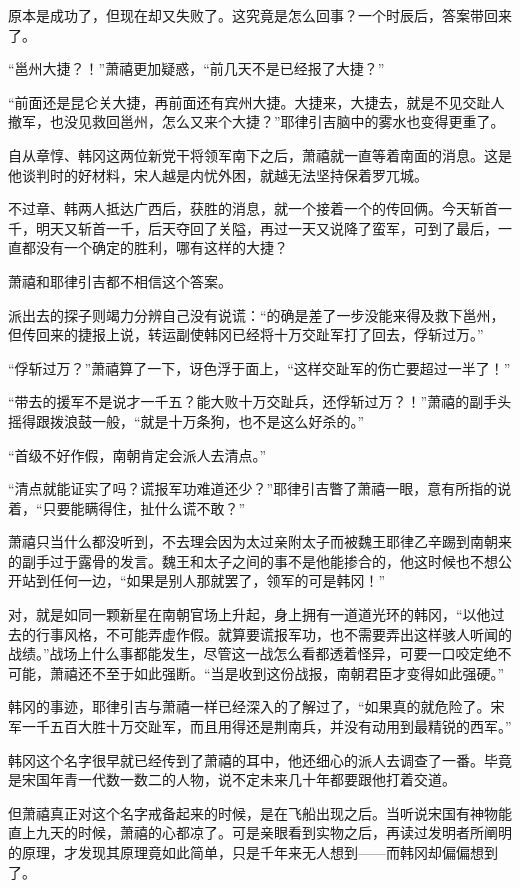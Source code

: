 原本是成功了，但现在却又失败了。这究竟是怎么回事？一个时辰后，答案带回来了。

“邕州大捷？！”萧禧更加疑惑，“前几天不是已经报了大捷？”

“前面还是昆仑关大捷，再前面还有宾州大捷。大捷来，大捷去，就是不见交趾人撤军，也没见救回邕州，怎么又来个大捷？”耶律引吉脑中的雾水也变得更重了。

自从章惇、韩冈这两位新党干将领军南下之后，萧禧就一直等着南面的消息。这是他谈判时的好材料，宋人越是内忧外困，就越无法坚持保着罗兀城。

不过章、韩两人抵达广西后，获胜的消息，就一个接着一个的传回俩。今天斩首一千，明天又斩首一千，后天夺回了关隘，再过一天又说降了蛮军，可到了最后，一直都没有一个确定的胜利，哪有这样的大捷？

萧禧和耶律引吉都不相信这个答案。

派出去的探子则竭力分辨自己没有说谎：“的确是差了一步没能来得及救下邕州，但传回来的捷报上说，转运副使韩冈已经将十万交趾军打了回去，俘斩过万。”

“俘斩过万？”萧禧算了一下，讶色浮于面上，“这样交趾军的伤亡要超过一半了！”

“带去的援军不是说才一千五？能大败十万交趾兵，还俘斩过万？！”萧禧的副手头摇得跟拨浪鼓一般，“就是十万条狗，也不是这么好杀的。”

“首级不好作假，南朝肯定会派人去清点。”

“清点就能证实了吗？谎报军功难道还少？”耶律引吉瞥了萧禧一眼，意有所指的说着，“只要能瞒得住，扯什么谎不敢？”

萧禧只当什么都没听到，不去理会因为太过亲附太子而被魏王耶律乙辛踢到南朝来的副手过于露骨的发言。魏王和太子之间的事不是他能掺合的，他这时候也不想公开站到任何一边，“如果是别人那就罢了，领军的可是韩冈！”

对，就是如同一颗新星在南朝官场上升起，身上拥有一道道光环的韩冈，“以他过去的行事风格，不可能弄虚作假。就算要谎报军功，也不需要弄出这样骇人听闻的战绩。”战场上什么事都能发生，尽管这一战怎么看都透着怪异，可要一口咬定绝不可能，萧禧还不至于如此强断。“当是收到这份战报，南朝君臣才变得如此强硬。”

韩冈的事迹，耶律引吉与萧禧一样已经深入的了解过了，“如果真的就危险了。宋军一千五百大胜十万交趾军，而且用得还是荆南兵，并没有动用到最精锐的西军。”

韩冈这个名字很早就已经传到了萧禧的耳中，他还细心的派人去调查了一番。毕竟是宋国年青一代数一数二的人物，说不定未来几十年都要跟他打着交道。

但萧禧真正对这个名字戒备起来的时候，是在飞船出现之后。当听说宋国有神物能直上九天的时候，萧禧的心都凉了。可是亲眼看到实物之后，再读过发明者所阐明的原理，才发现其原理竟如此简单，只是千年来无人想到——而韩冈却偏偏想到了。

